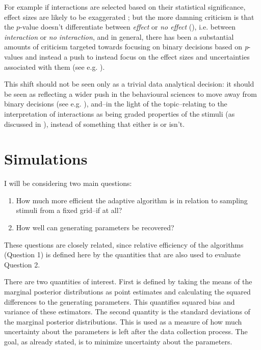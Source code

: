 \documentclass{article}\usepackage{knitr}
\begin{document}
For example if interactions are selected based on their statistical significance, effect sizes are likely to be exaggerated \citep{gelman2018}; but the more damning criticism is that the $p$-value doesn't differentiate between \textit{effect} or \textit{no effect} (\cite{greenland2016}), i.e. between \textit{interaction} or \textit{no interaction}, and in general, there has been a substantial amounts of criticism targeted towards focusing on binary decisions based on \textit{p}-values and instead a push to instead focus on the effect sizes and uncertainties associated with them (see e.g. \citet{kline2004, greenland2016, steiger1997}). 

This shift should not be seen only as a trivial data analytical decision: it should be seen as reflecting a wider push in the behavioural sciences to move away from binary decisions (see e.g. \citet{amrhein2017}), and--in the light of the topic--relating to the interpretation of interactions as being graded properties of the stimuli (as discussed in \citet{kemler1993}), instead of something that either is or isn't.

\newpage


\section{Simulations}
\label{sec:simulations}

I will be considering two main questions: 

\begin{enumerate}
  \item How much more efficient the adaptive algorithm is in relation to sampling stimuli from a fixed grid--if at all? 
  \item How well can generating parameters be recovered?
\end{enumerate}

These questions are closely related, since relative efficiency of the algorithms (Question 1) is defined here by the quantities that are also used to evaluate Question 2. 

There are two quantities of interest. First is defined by taking the means of the marginal posterior distributions as point estimates and calculating the squared differences to the generating parameters. This quantifies squared bias and variance of these estimators. The second quantity is the standard deviations of the marginal posterior distributions. This is used as a measure of how much uncertainty about the parameters is left after the data collection process. The goal, as already stated, is to minimize uncertainty about the parameters.
\end{document}
